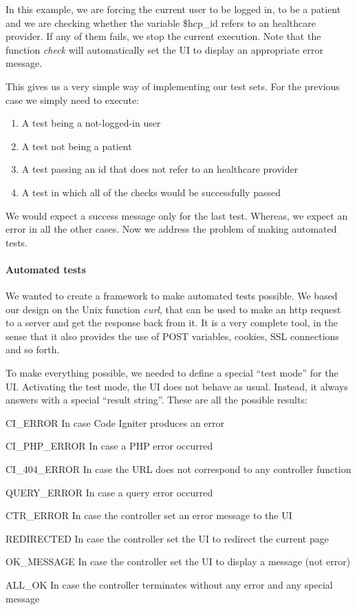 In this example, we are forcing the current user to be logged in, to be a patient and we are checking whether the variable \$hcp\_id refers to an healthcare provider. If any of them fails, we stop the current execution. Note that the function \emph{check} will automatically set the UI to display an appropriate error message.

This gives us a very simple way of implementing our test sets. For the previous case we simply need to execute:
\begin{enumerate}
\item A test being a not-logged-in user
\item A test not being a patient
\item A test passing an id that does not refer to an healthcare provider
\item A test in which all of the checks would be successfully passed
\end{enumerate}
We would expect a success message only for the last test. Whereas, we expect an error in all the other cases. Now we address the problem of making automated tests.

\paragraph{Automated tests}
We wanted to create a framework to make automated tests possible. We based our design on the Unix function \emph{curl}, that can be used to make an http request to a server and get the response back from it. It is a very complete tool, in the sense that it also provides the use of POST variables, cookies, SSL connections and so forth.

To make everything possible, we needed to define a special ``test mode'' for the UI. Activating the test mode, the UI does not behave as usual. Instead, it always answers with a special ``result string''. These are all the possible results:
\begin{description}
\item CI\_ERROR In case Code Igniter produces an error
\item CI\_PHP\_ERROR In case a PHP error occurred
\item CI\_404\_ERROR In case the URL does not correspond to any controller function
\item QUERY\_ERROR In case a query error occurred
\item CTR\_ERROR In case the controller set an error message to the UI
\item REDIRECTED In case the controller set the UI to redirect the current page
\item OK\_MESSAGE In case the controller set the UI to display a message (not error)
\item ALL\_OK In case the controller terminates without any error and any special message
\end{description}

